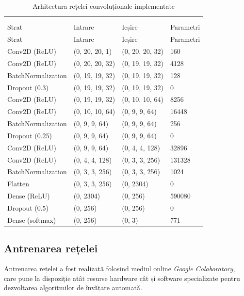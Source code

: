 \begin{longtable}{@{}*4l@{}}
\renewcommand{\arraystretch}{1.2}\\
\caption{Arhitectura rețelei convoluționale implementate}\label{tabel:cnn-arch}\\
\rowcolor{gray!50}
Strat & Intrare & Ieșire & Parametri \\
\endfirsthead
\rowcolor{gray!50}
Strat & Intrare & Ieșire & Parametri \\
\endhead
Conv2D (ReLU) & (0, 20, 20, 1) & (0, 20, 20, 32) & 160 \\
Conv2D (ReLU) & (0, 20, 20, 32) & (0, 19, 19, 32) & 4128 \\
BatchNormalization & (0, 19, 19, 32) & (0, 19, 19, 32) & 128 \\
Dropout (0.3) & (0, 19, 19, 32) & (0, 19, 19, 32) & 0 \\
Conv2D (ReLU) & (0, 19, 19, 32) & (0, 10, 10, 64) & 8256 \\
Conv2D (ReLU) & (0, 10, 10, 64) & (0, 9, 9, 64) & 16448 \\
BatchNormalization & (0, 9, 9, 64) & (0, 9, 9, 64) & 256 \\
Dropout (0.25) & (0, 9, 9, 64) & (0, 9, 9, 64) & 0 \\
Conv2D (ReLU) & (0, 9, 9, 64) & (0, 4, 4, 128) & 32896 \\
Conv2D (ReLU) & (0, 4, 4, 128) & (0, 3, 3, 256) & 131328 \\
BatchNormalization & (0, 3, 3, 256) & (0, 3, 3, 256) & 1024 \\ \midrule
Flatten & (0, 3, 3, 256) & (0, 2304) & 0 \\
Dense (ReLU) & (0, 2304) & (0, 256) & 590080 \\
Dropout (0.5) & (0, 256) & (0, 256) & 0 \\
Dense (softmax) & (0, 256) & (0, 3) & 771 \\ \bottomrule
\end{longtable}

\subsection{Antrenarea rețelei}\label{ssch:antrenarea}
Antrenarea rețelei a fost realizată folosind mediul online \textit{Google Colaboratory}, care pune la dispoziție atât resurse hardware cât și software specializate pentru dezvoltarea algoritmilor de învățare automată.

